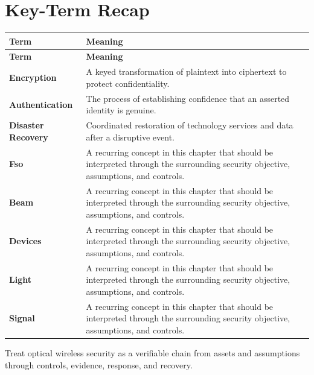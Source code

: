 \documentclass[11pt]{article}
\begin{document}
\section*{Key-Term Recap}
\begin{longtable}{>{\RaggedRight\arraybackslash}p{}>{\RaggedRight\arraybackslash}p{}}
\toprule\rowcolor{Navy}\color{white}\textbf{Term} & \color{white}\textbf{Meaning}\\\midrule
\endfirsthead
\toprule\rowcolor{Navy}\color{white}\textbf{Term} & \color{white}\textbf{Meaning}\\\midrule
\endhead
\textbf{Encryption} & A keyed transformation of plaintext into ciphertext to protect confidentiality. \\\midrule
\textbf{Authentication} & The process of establishing confidence that an asserted identity is genuine. \\\midrule
\textbf{Disaster Recovery} & Coordinated restoration of technology services and data after a disruptive event. \\\midrule
\textbf{Fso} & A recurring concept in this chapter that should be interpreted through the surrounding security objective, assumptions, and controls. \\\midrule
\textbf{Beam} & A recurring concept in this chapter that should be interpreted through the surrounding security objective, assumptions, and controls. \\\midrule
\textbf{Devices} & A recurring concept in this chapter that should be interpreted through the surrounding security objective, assumptions, and controls. \\\midrule
\textbf{Light} & A recurring concept in this chapter that should be interpreted through the surrounding security objective, assumptions, and controls. \\\midrule
\textbf{Signal} & A recurring concept in this chapter that should be interpreted through the surrounding security objective, assumptions, and controls. \\\midrule
\bottomrule
\end{longtable}
\begin{takeawaybox}
Treat optical wireless security as a verifiable chain from assets and assumptions through controls, evidence, response, and recovery.
\end{takeawaybox}
\end{document}
